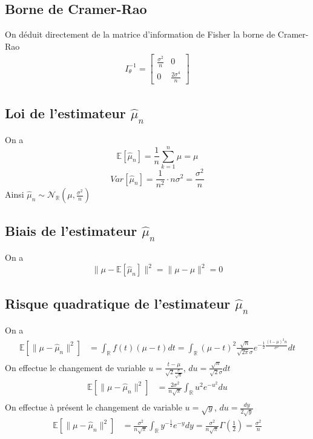 \documentclass{report}
\begin{document}
		\subsection{Borne de Cramer-Rao}
			On déduit directement de la matrice d'information de Fisher la borne de Cramer-Rao
			\begin{align*}
				I_\theta^{-1}
				=
				\left[\begin{array}{cc}
					\frac{\sigma^2}{n} & 0 \\
					0 & \frac{2\sigma^4}{n}
				\end{array}\right]
			\end{align*}
		\subsection{Loi de l'estimateur $\hat\mu_n$}
			On a
			\[ \mathbb{E}[\hat\mu_n] = \frac{1}{n}\sum\limits_{k=1}^n \mu = \mu \]
			\[ Var[\hat\mu_n] = \frac{1}{n^2} \cdot n \sigma^2 = \frac{\sigma^2}{n} \]
			Ainsi $\hat\mu_n \sim \mathcal{N}_{\mathbb{R}}(\mu, \frac{\sigma^2}{n})$
		\subsection{Biais de l'estimateur $\hat\mu_n$}
			On a
			\[ \lVert\mu - \mathbb{E}[\hat\mu_n]\rVert^2 = \lVert \mu - \mu \rVert^2 = 0 \]
		\subsection{Risque quadratique de l'estimateur $\hat\mu_n$}
			On a
			\begin{align*}
				\mathbb{E}[ \lVert \mu - \hat\mu_n \rVert^2 ] &= \int_\mathbb{R} f(t)(\mu - t)dt = \int_\mathbb{R} (\mu - t)^2 \frac{\sqrt n}{\sqrt{2\pi}\sigma}e^{-\frac{1}{2}\frac{(t-\mu)^2 n}{\sigma^2}}dt\\
			\end{align*}
			On effectue le changement de variable $u = \frac{t-\mu}{\sqrt 2 \frac{\sigma}{\sqrt n}}$, $du = \frac{\sqrt n}{\sqrt 2 \sigma}dt$
			\begin{align*}
				\mathbb{E}[ \lVert \mu - \hat\mu_n \rVert^2 ] &= \frac{2\sigma^2}{n\sqrt \pi}\int_\mathbb{R} u^2 e^{-u^2}du \\
			\end{align*}
			On effectue à présent le changement de variable $u=\sqrt y$, $du = \frac{dy}{2 \sqrt y}$
			\begin{align*}
				\mathbb{E}[ \lVert \mu - \hat\mu_n \rVert^2 ] &= \frac{\sigma^2}{n\sqrt \pi}\int_\mathbb{R} y^{-\frac{1}{2}} e^{-y}dy = \frac{\sigma^2}{n\sqrt \pi} \Gamma(\frac{1}{2}) = \frac{\sigma^2}{n} \\
			\end{align*}
\end{document}
